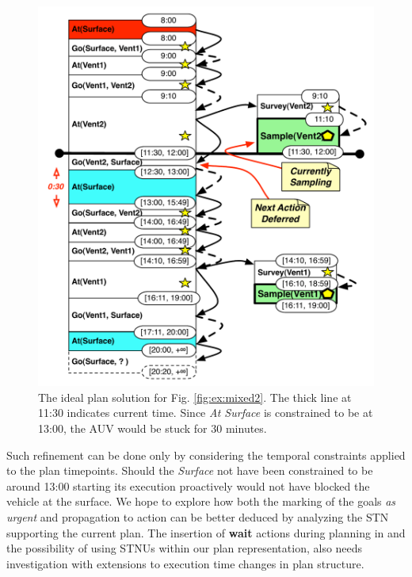 \begin{figure}[!htb]
  \centering
  \includegraphics[width=0.8\columnwidth]{figs/example_ideal}
  \vskip-3mm
  \caption{\small The ideal plan solution for
    Fig. \ref{fig:ex:mixed2}. The thick line at 11:30 indicates
    current time. Since {\em At Surface} is constrained to be at
    13:00, the AUV would be stuck for $30$ minutes.}
  \label{fig:res:ideal}
  \vskip-3mm
\end{figure}
 
Such refinement can be done only by considering the temporal
constraints applied to the plan timepoints. Should the {\em Surface}
not have been constrained to be around 13:00 starting its execution
proactively would not have blocked the vehicle at the surface. We hope
to explore how both the marking of the goals {\em as urgent} and
propagation to action can be better deduced by analyzing the STN
supporting the current plan. The insertion of {\bf wait} actions
during planning in \cite{morris01} and the possibility of using STNUs
within our plan representation, also needs investigation with
extensions to execution time changes in plan structure.

